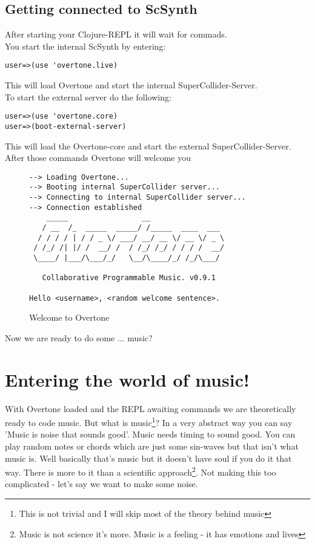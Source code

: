 \section{Getting connected to ScSynth}
After starting your Clojure-\gls{REPL} it will wait for commads.\\
You start the internal \gls{ScSynth} by entering:
\begin{lstlisting}
user=>(use 'overtone.live)
\end{lstlisting}
This will load Overtone and start the internal SuperCollider-Server.\\

To start the external server do the following:
\begin{lstlisting}
user=>(use 'overtone.core)
user=>(boot-external-server)
\end{lstlisting}
This will load the Overtone-core and start the external SuperCollider-Server.\\
After those commands Overtone will welcome you

\begin{figure}[h]
\caption{Welcome to Overtone}

\begin{lstlisting}
--> Loading Overtone...
--> Booting internal SuperCollider server...
--> Connecting to internal SuperCollider server...
--> Connection established
    _____                 __
   / __  /_  _____  _____/ /_____  ____  ___
  / / / / | / / _ \/ ___/ __/ __ \/ __ \/ _ \
 / /_/ /| |/ /  __/ /  / /_/ /_/ / / / /  __/
 \____/ |___/\___/_/   \__/\____/_/ /_/\___/

   Collaborative Programmable Music. v0.9.1

Hello <username>, <random welcome sentence>.

\end{lstlisting}

\end{figure}
Now we are ready to do some ... music?

\chapter{Entering the world of music!}
With Overtone loaded and the REPL awaiting commands we are theoretically ready to code music. But what is music\footnote{This is not trivial and I will skip most of the theory behind music}? In a very abstract way you can say 'Music is noise that sounds good'. Music needs timing to sound good. You can play random notes or chords which are just some sin-waves but that isn't what music is. Well basically that's music but it doesn't have soul if you do it that way. There is more to it than a scientific approach\footnote{Music is not science it's more. Music is a feeling - it has emotions and lives}.
Not making this too complicated - let's say we want to make some noise.\\

